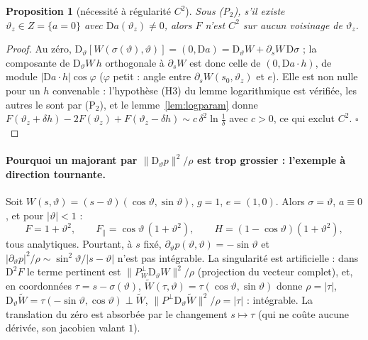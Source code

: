 \documentclass[11pt,a4paper]{article}
\newtheorem{proposition}[theoreme]{Proposition}
\theoremstyle{remark}
\newcommand{\vth}{\vartheta}
\newcommand{\D}{\mathrm D}
\begin{document}
\begin{proposition}[nécessité à régularité $C^2$]\label{prop:nec2}
Sous (P$_2$), s'il existe $\vth_z\in Z=\{a=0\}$ avec $\D a(\vth_z)\ne0$, alors $F$ n'est $C^2$ sur aucun voisinage de $\vth_z$.
\end{proposition}
\begin{proof}
Au zéro, $\D_\vth[W(\sigma(\vth),\vth)]=(0,\D a)=\D_\vth W+\partial_sW\,\D\sigma$ ; la composante de $\D_\vth W\,h$ orthogonale à $\partial_sW$ est donc celle de $(0,\D a\cdot h)$, de module $\lvert\D a\cdot h\rvert\cos\varphi$ ($\varphi$ petit : angle entre $\partial_sW(s_0,\vth_z)$ et $e$). Elle est non nulle pour un $h$ convenable : l'hypothèse (H3) du lemme logarithmique est vérifiée, les autres le sont par (P$_2$), et le lemme~\ref{lem:logparam} donne $F(\vth_z+\delta h)-2F(\vth_z)+F(\vth_z-\delta h)\sim c\,\delta^2\ln\frac1\delta$ avec $c>0$, ce qui exclut $C^2$. $\square$
\end{proof}

\paragraph{Pourquoi un majorant par $\lVert\D_\vth p\rVert^2/\rho$ est trop grossier : l'exemple à direction tournante.} Soit $W(s,\vth)=(s-\vth)(\cos\vth,\sin\vth)$, $g=1$, $e=(1,0)$. Alors $\sigma=\vth$, $a\equiv0$, et pour $\lvert\vth\rvert<1$ :
\[
F=1+\vth^2,\qquad F_\parallel=\cos\vth\,(1+\vth^2),\qquad H=(1-\cos\vth)(1+\vth^2),
\]
tous analytiques. Pourtant, à $s$ fixé, $\partial_\vth p(\vth,\vth)=-\sin\vth$ et $\lvert\partial_\vth p\rvert^2/\rho\sim\sin^2\vth/\lvert s-\vth\rvert$ n'est pas intégrable. La singularité est artificielle : dans $\D^2F$ le terme pertinent est $\lVert P^\perp_W\D_\vth W\rVert^2/\rho$ (projection du vecteur complet), et, en coordonnées $\tau=s-\sigma(\vth)$, $\tilde W(\tau,\vth)=\tau(\cos\vth,\sin\vth)$ donne $\rho=\lvert\tau\rvert$, $\D_\vth\tilde W=\tau(-\sin\vth,\cos\vth)\perp\tilde W$, $\lVert P^\perp\D_\vth\tilde W\rVert^2/\rho=\lvert\tau\rvert$ : intégrable. La translation du zéro est absorbée par le changement $s\mapsto\tau$ (qui ne coûte aucune dérivée, son jacobien valant $1$).
\end{document}
